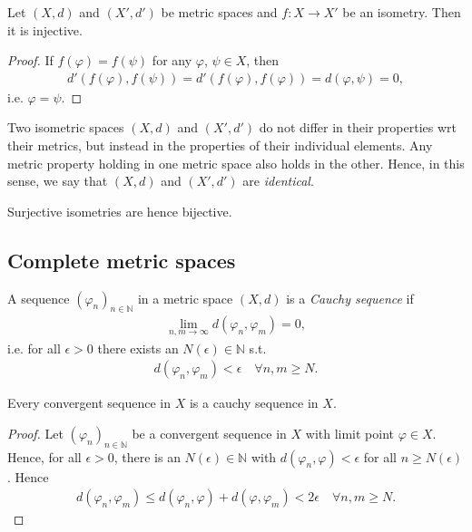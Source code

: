 \begin{theorem}\label{thrm:isometries_injective}
	Let $(X, d)$ and $(X', d')$ be metric spaces and $f: X\rightarrow X'$  be an isometry. Then it is injective.
\end{theorem}

\begin{proof}
	If $f(\varphi) = f(\psi)$ for any $\varphi$, $\psi\in X$, then 
	\begin{align}
		d'(f(\varphi), f(\psi)) = d'(f(\varphi), f(\varphi)) = d(\varphi, \psi) = 0, 
	\end{align}
	i.e. $\varphi = \psi$.
\end{proof}

\begin{remark}
	Two isometric spaces $(X, d)$ and $(X', d')$ do not differ in their properties wrt their metrics, but instead in the properties of their individual elements. Any metric property holding in one metric space also holds in the other. Hence, in this sense, we say that $(X, d)$ and $(X', d')$ are \textit{identical}.
\end{remark}

\begin{remark}
	Surjective isometries are hence bijective.
\end{remark}

\subsection{Complete metric spaces}

\begin{defn}
	A sequence $(\varphi_n)_{n\in\mathbb N}$ in a metric space $(X, d)$ is a \textit{Cauchy sequence} if 
	\begin{align}
		\lim\limits_{n, m\to\infty} d(\varphi_n, \varphi_m) = 0,
	\end{align}
	i.e. for all $\epsilon > 0$ there exists an $N(\epsilon)\in \mathbb N$ s.t. 
	\begin{align}
		d(\varphi_n, \varphi_m) < \epsilon \quad\forall n, m\geq N.
	\end{align}
\end{defn}

\begin{theorem}\label{thrm:convergent_sequence_cauchy_sequence}
	Every convergent sequence in $X$ is a cauchy sequence in $X$.
\end{theorem}

\begin{proof}
	Let $(\varphi_n)_{n\in\mathbb N}$ be a convergent sequence in $X$ with limit point $\varphi\in X$. Hence, for all $\epsilon > 0$, there is an $N(\epsilon)\in\mathbb N$ with $d(\varphi_n, \varphi) < \epsilon$ for all $n\geq N(\epsilon)$. Hence
	\begin{align}
		d(\varphi_n, \varphi_m) \leq d(\varphi_n, \varphi) + d(\varphi, \varphi_m) < 2\epsilon \quad\forall n,m\geq N.
	\end{align}
\end{proof}

